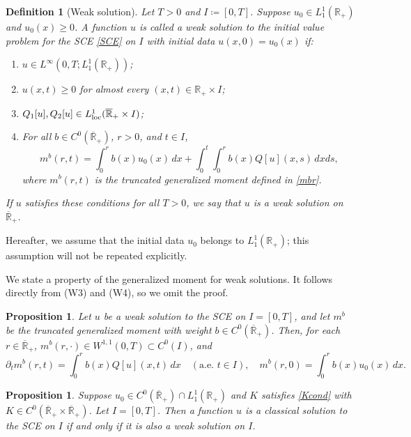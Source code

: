 \documentclass[a4paper,11pt]{article}
\newtheorem{prop}[thm]{Proposition}
\newtheorem{dfn}[thm]{Definition}
\def\Rp{{\mathbb R}_+}
\def\Rb{\overline{{\mathbb R}}_+}
\begin{document}
\begin{dfn}[Weak solution] \label{weaksol}
Let $T > 0$ and $I \coloneqq [0,T]$. Suppose $u_0 \in L^1_1(\Rp)$ and $u_0(x) \ge 0$. A function $u$ is called a weak solution to the initial value problem for the SCE \eqref{SCE} on $I$ with initial data $u(x,0) = u_0(x)$ if:
\begin{enumerate}[{\rm (W1)}]
  \item $u \in L^\infty(0,T; L^1_1(\Rp))$;
  \item $u(x,t) \ge 0$ for almost every $(x,t) \in \Rp \times I$;
  \item $Q_1[u], Q_2[u] \in L^1_{\rm loc}(\Rb \times I)$;
  \item For all $b \in C^0(\Rb)$, $r > 0$, and $t \in I$,
  \[
  m^b(r,t) = \int_0^r b(x)u_0(x)\,dx + \int_0^t \int_0^r b(x)Q[u](x,s)\,dxds,
  \]
  where $m^b(r,t)$ is the truncated generalized moment defined in \eqref{mbr}.
\end{enumerate}
If $u$ satisfies these conditions for all $T > 0$, we say that $u$ is a weak solution on $\Rb$.
\end{dfn}

Hereafter, we assume that the initial data $u_0$ belongs to $L^1_1(\Rp)$; this assumption will not be repeated explicitly.

We state a property of the generalized moment for weak solutions. It follows directly from (W3) and (W4), so we omit the proof.

\begin{prop}\label{weaksolpr}
Let $u$ be a weak solution to the SCE on $I = [0,T]$, and let $m^b$ be the truncated generalized moment with weight $b \in C^0(\Rb)$. Then, for each $r \in \Rb$, $m^b(r,\cdot) \in W^{1,1}(0,T) \subset C^0(I)$, and 
\[
\partial_t m^b(r,t) = \int_0^r b(x)Q[u](x,t)\,dx \quad (\text{a.e. } t \in I), \quad
m^b(r,0) = \int_0^r b(x)u_0(x)\,dx.
\]
\end{prop}

\begin{prop}
Suppose $u_0 \in C^0(\Rb) \cap L^1_1(\Rp)$ and $K$ satisfies \eqref{Kcond} with $K \in C^0(\Rb \times \Rb)$. Let $I = [0,T]$. Then a function $u$ is a classical solution to the SCE on $I$ if and only if it is also a weak solution on $I$.
\end{prop}
\end{document}
